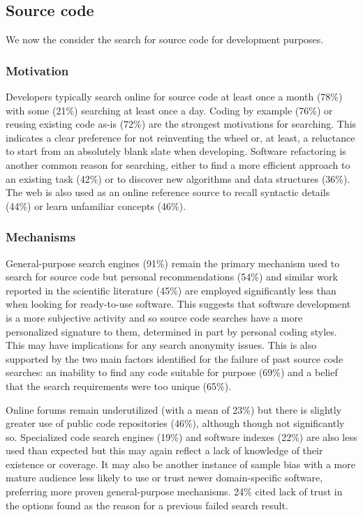 \documentclass{casicswhitepaper}
\begin{document}
\subsection{Source code}

We now the consider the search for source code for development purposes.

\subsubsection{Motivation}

Developers typically search online for source code at least once a month (78\%) with some (21\%) searching at least once a day. Coding by example (76\%) or reusing existing code as-is (72\%) are the strongest motivations for searching. This indicates a clear preference for not reinventing the wheel or, at least, a reluctance to start from an absolutely blank slate when developing. Software refactoring is another common reason for searching, either to find a more efficient approach to an existing task (42\%) or to discover new algorithms and data structures (36\%). The web is also used as an online reference source to recall syntactic details (44\%) or learn unfamiliar concepts (46\%). 

\subsubsection{Mechanisms}

General-purpose search engines (91\%) remain the primary mechanism used to search for source code but personal recommendations (54\%) and similar work reported in the scientific literature (45\%) are employed significantly less than when looking for ready-to-use software. This suggests that software development is a more subjective activity and so source code searches have a more personalized signature to them, determined in part by personal coding styles. This may have implications for any search anonymity issues. This is also supported by the two main factors identified for the failure of past source code searches: an inability to find any code suitable for purpose (69\%) and a belief that the search requirements were too unique (65\%).

Online forums remain underutilized (with a mean of 23\%) but there is slightly greater use of public code repositories (46\%), although though not significantly so. Specialized code search engines (19\%) and software indexes (22\%) are also less used than expected but this may again reflect a lack of knowledge of their existence or coverage. It may also be another instance of sample bias with a more mature audience less likely to use or trust newer domain-specific software, preferring more proven general-purpose mechanisms.
24\% cited lack of trust in the options found as the reason for a previous failed search result.
\end{document}
